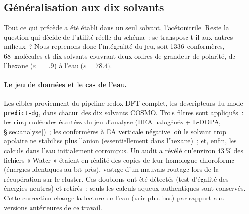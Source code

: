 \subsection{Généralisation aux dix solvants}
\label{sec:multisolvant}

Tout ce qui précède a été établi dans un seul solvant, l'acétonitrile. Reste la question qui décide de l'utilité réelle du schéma~: se transpose-t-il aux autres milieux~? Nous reprenons donc l'intégralité du jeu, soit 1336~conformères, 68~molécules et dix solvants couvrant deux ordres de grandeur de polarité, de l'hexane ($\varepsilon = 1.9$) à l'eau ($\varepsilon = 78.4$).

\paragraph{Le jeu de données et le cas de l'eau.}
Les cibles proviennent du pipeline redox DFT complet, les descripteurs du mode \texttt{predict-dg}, dans chacun des dix solvants COSMO. Trois filtres sont appliqués~: les cinq molécules écartées du jeu d'analyse (DEA halogénés + L-DOPA, §\ref{sec:analyse})~; les conformères à EA verticale négative, où le solvant trop apolaire ne stabilise plus l'anion (essentiellement dans l'hexane)~; et, enfin, les calculs dans l'eau initialement corrompus. Un audit a révélé qu'environ $43~\%$ des fichiers « Water » étaient en réalité des copies de leur homologue chloroforme (énergies identiques au bit près), vestige d'un mauvais routage lors de la récupération sur le cluster. Ces doublons ont été détectés (test d'égalité des énergies neutres) et retirés~; seuls les calculs aqueux authentiques sont conservés. Cette correction change la lecture de l'eau (voir plus bas) par rapport aux versions antérieures de ce travail.

